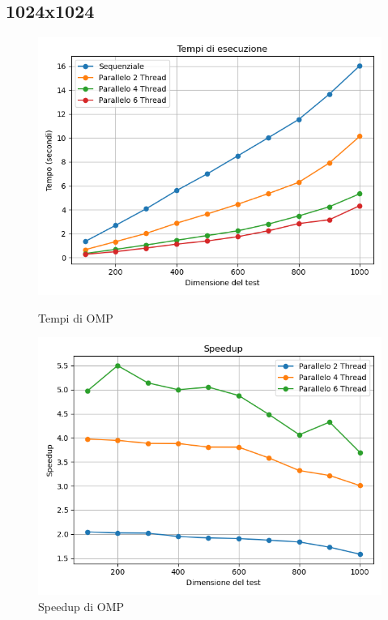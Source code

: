 \documentclass[11pt]{article}
\begin{document}
    \subsection{1024x1024}\label{subsec:1024x1024}
    \begin{figure}[H]
        \centering
        \begin{minipage}{0.49\textwidth}
            \centering
            \includegraphics[width=\textwidth]{plots/1024/omp_times}
            \caption{Tempi di OMP}\label{fig:times-1024-omp}
        \end{minipage}
        \begin{minipage}{0.49\textwidth}
            \centering
            \includegraphics[width=\textwidth]{plots/1024/omp_speedup}
            \caption{Speedup di OMP}\label{fig:speedup-1024-omp}
        \end{minipage}
    \end{figure}
\end{document}
